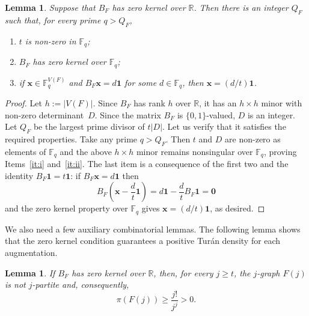\documentclass[12pt,a4paper]{article}
\numberwithin{equation}{section}
\newtheorem{lemma}[theorem]{Lemma}
\theoremstyle{definition}
\theoremstyle{remark}
\newcommand{\V}[1]{\boldsymbol{#1}}
\begin{document}
\begin{lemma}\label{lem:app-good-characteristics}
Suppose that $B_F$ has zero kernel over $\mathbb R$.  Then there is an integer $Q_F$ such that, for every prime $q> Q_F$,
\begin{enumerate}[label=\textup{(\roman*)}]
\item\label{it:i} $t$ is non-zero in $\mathbb F_q$;
\item\label{it:ii} $B_F$ has zero kernel over $\mathbb F_q$;
\item\label{it:iii} if $\V{x}\in\mathbb F_q^{V(F)}$ and $B_F\V{x}=d\mathbf 1$ for some $d\in\mathbb F_q$, then $\V{x}=(d/t)\mathbf 1$.
\end{enumerate}
\end{lemma}

\begin{proof}
Let $h:=|V(F)|$.  Since $B_F$ has rank $h$ over $\mathbb R$, it has an $h\times h$ minor with non-zero determinant~$D$. Since the matrix $B_F$ is $\{0,1\}$-valued, $D$ is an integer. Let $Q_F$ be the largest prime divisor of $t|D|$. Let us verify that it satisfies the required properties. Take any prime $q> Q_F$. Then $t$ and $D$ are non-zero as elements of $\mathbb F_q$ and the above $h\times h$ minor remains nonsingular over $\mathbb F_q$, proving Items~\ref{it:i} and~\ref{it:ii}. The last item is a consequence of the first two and the identity $B_F\mathbf 1=t\mathbf 1$: if $B_F\V{x}=d\mathbf 1$ then
\[
 B_F\left(\V{x}-\frac dt\mathbf 1\right)
 =d\mathbf 1-\frac dt B_F\mathbf 1=\V{0}
\]
and the zero kernel property over $\mathbb F_q$ gives $\V{x}=(d/t)\mathbf 1$, as desired.
\end{proof}



We also need a few auxiliary combinatorial lemmas. The following lemma shows that the zero kernel condition guarantees a positive Tur\'an density for each augmentation.

\begin{lemma}\label{lem:app-augmentation-positive}
	If $B_F$ has zero kernel over $\mathbb R$, then,  for every $j\ge t$,  the $j$-graph $F(j)$ is not $j$-partite and, consequently,
	\begin{equation*}
		\pi(F(j))\ge\frac{j!}{j^j}>0.
	\end{equation*}
\end{lemma}
\end{document}
